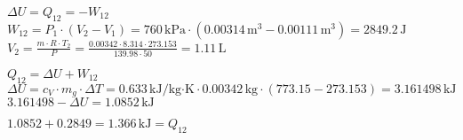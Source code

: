 \( \Delta U = Q_{12} = -W_{12} \)  
\( W_{12} = P_1 \cdot (V_2 - V_1) = 760 \, \text{kPa} \cdot (0.00314 \, \text{m}^3 - 0.00111 \, \text{m}^3) = 2849.2 \, \text{J} \)  
\( V_2 = \frac{m \cdot R \cdot T_2}{P} = \frac{0.00342 \cdot 8.314 \cdot 273.153}{139.98 \cdot 50} = 1.11 \, \text{L} \)  

\( Q_{12} = \Delta U + W_{12} \)  
\( \Delta U = c_V \cdot m_g \cdot \Delta T = 0.633 \, \text{kJ/kg·K} \cdot 0.00342 \, \text{kg} \cdot (773.15 - 273.153) = 3.161498 \, \text{kJ} \)  
\( 3.161498 - \Delta U = 1.0852 \, \text{kJ} \)  

\( 1.0852 + 0.2849 = 1.366 \, \text{kJ} = Q_{12} \)